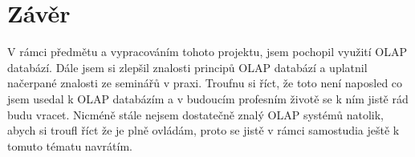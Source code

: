 \chapter{Závěr}
V rámci předmětu a vypracováním tohoto projektu, jsem pochopil využití OLAP databází. Dále jsem si zlepšil znalosti principů OLAP
databází a uplatnil načerpané znalosti ze seminářů v praxi. Troufnu si říct, že toto není naposled co
jsem usedal k OLAP databázím a v budoucím profesním životě se k ním jistě rád budu vracet. Nicméně stále nejsem dostatečně znalý OLAP systémů natolik, abych si troufl říct že je plně
ovládám, proto se jistě v rámci samostudia ještě k tomuto tématu navrátím.